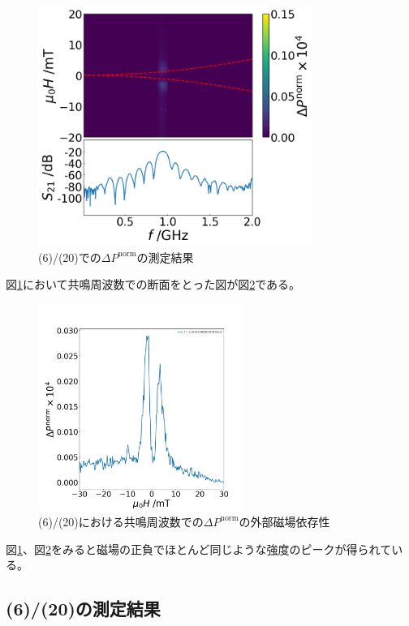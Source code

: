 \documentclass[dvipdfmx,11pt]{jsreport}
\numberwithin{equation}{chapter}
\numberwithin{table}{chapter}
\begin{document}
\begin{figure}[H]
	\centering
	\includegraphics[width=0.80\textwidth]{figdata/ptpyp.png}
	\caption{(6)/(20)での$\Delta P^{\text{norm}}$の測定結果}
	\label{fig:ptpyp}
\end{figure}
図\ref{fig:ptpyp}において共鳴周波数での断面をとった図が図\ref{fig:ptpyd}である。
\begin{figure}[H]
	\centering
	\includegraphics[width=0.6\textwidth]{figdata/ptpy17-1danmen.png}
	\caption{\normalsize{(6)/(20)における共鳴周波数での$\Delta P^{\text{norm}}$の外部磁場依存性}}
	\label{fig:ptpyd}
\end{figure}
図\ref{fig:ptpyp}、図\ref{fig:ptpyd}をみると磁場の正負でほとんど同じような強度のピークが得られている。
\subsection{(6)/(20)の測定結果}
\end{document}
